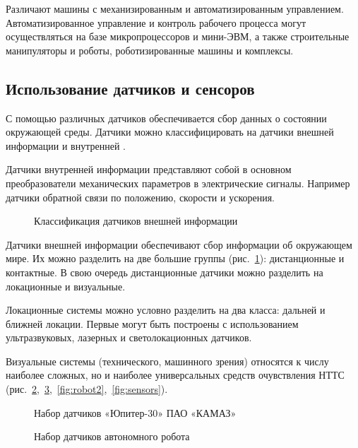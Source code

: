 Различают машины с механизированным и автоматизированным управлением. Автоматизированное управление и контроль рабочего процесса могут осуществляться на базе микропроцессоров и мини-ЭВМ, а также строительные манипуляторы и роботы, роботизированные машины и комплексы.

\subsection{Использование датчиков и сенсоров}\label{subsec:ch1/sec2/sub2}

С помощью различных датчиков обеспечивается сбор данных о состоянии окружающей среды. Датчики можно классифицировать на датчики внешней информации и внутренней \cite[с.~131]{Vlasov}. 

Датчики внутренней информации представляют собой в основном преобразователи механических параметров в электрические сигналы. Например датчики обратной связи по положению, скорости и ускорения.

\begin{figure}[ht]
    \caption{Классификация датчиков внешней информации}\label{fig:datchiki}
\end{figure}

Датчики внешней информации обеспечивают сбор информации об окружающем мире. Их можно разделить на две большие группы (рис.~\cref{fig:datchiki}): дистанционные и контактные. В свою очередь дистанционные датчики можно разделить на локационные и визуальные.

Локационные системы можно условно разделить на два класса: дальней и ближней локации. Первые могут быть построены с использованием ультразвуковых, лазерных и светолокационных датчиков.

Визуальные системы (технического, машинного зрения) относятся к числу наиболее сложных, но и наиболее универсальных средств очувствления НТТС (рис.~\cref{fig:kamaz},~\cref{fig:robot1},~\cref{fig:robot2},~\cref{fig:sensors}).

\begin{figure}[ht]
    \caption{Набор датчиков «Юпитер-30» ПАО «КАМАЗ»}\label{fig:kamaz}
\end{figure}

\begin{figure}[ht]
    \caption{Набор датчиков автономного робота}\label{fig:robot1}
\end{figure}

